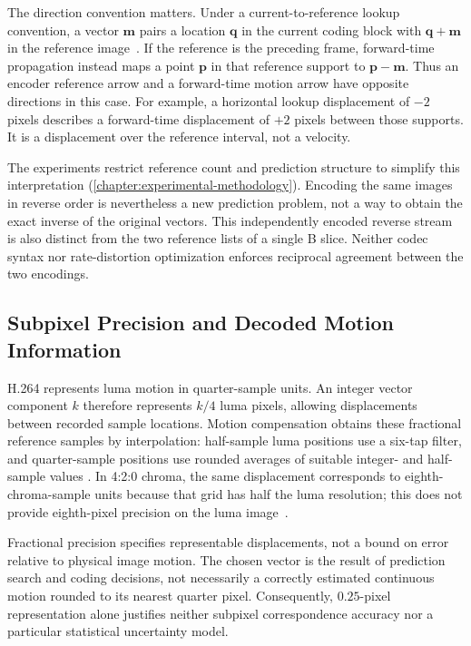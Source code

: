 The direction convention matters. Under a current-to-reference lookup
convention, a vector $\mathbf{m}$ pairs a location $\mathbf{q}$ in the current
coding block with $\mathbf{q}+\mathbf{m}$ in the reference
image~\cite[Sec.~3.95]{ITUT_H264_2026}. If the reference
is the preceding frame, forward-time propagation instead maps a point
$\mathbf{p}$ in that reference support to $\mathbf{p}-\mathbf{m}$. Thus an encoder
reference arrow and a forward-time motion arrow have opposite directions in
this case. For example, a horizontal lookup displacement of $-2$ pixels describes
a forward-time displacement of $+2$ pixels between those supports. It is a
displacement over the reference interval, not a velocity.

The experiments restrict reference count and prediction structure to simplify
this interpretation (\autoref{chapter:experimental-methodology}). Encoding the
same images in reverse order is nevertheless a new prediction problem, not a
way to obtain the exact inverse of the original vectors. This independently
encoded reverse stream is also distinct from the two reference lists of a
single B slice. Neither codec syntax nor rate-distortion optimization enforces
reciprocal agreement between the two encodings.

\subsection{Subpixel Precision and Decoded Motion Information}

H.264 represents luma motion in quarter-sample units. An integer vector
component $k$ therefore represents $k/4$ luma pixels, allowing displacements
between recorded sample locations. Motion compensation obtains these
fractional reference samples by interpolation: half-sample luma positions use
a six-tap filter, and quarter-sample positions use rounded averages of suitable
integer- and half-sample values
\cite[Secs.~8.4.2.2 and~8.4.2.2.1]{ITUT_H264_2026}. In 4:2:0 chroma, the
same displacement corresponds to eighth-chroma-sample units because that grid
has half the luma resolution; this does not provide eighth-pixel precision on
the luma image~\cite[Sec.~8.4.1.4]{ITUT_H264_2026}.

Fractional precision specifies representable displacements, not a bound on
error relative to physical image motion. The chosen vector is the result of
prediction search and coding decisions, not necessarily a correctly estimated
continuous motion rounded to its nearest quarter pixel. Consequently,
$0.25$-pixel representation alone justifies neither subpixel correspondence
accuracy nor a particular statistical uncertainty model.

